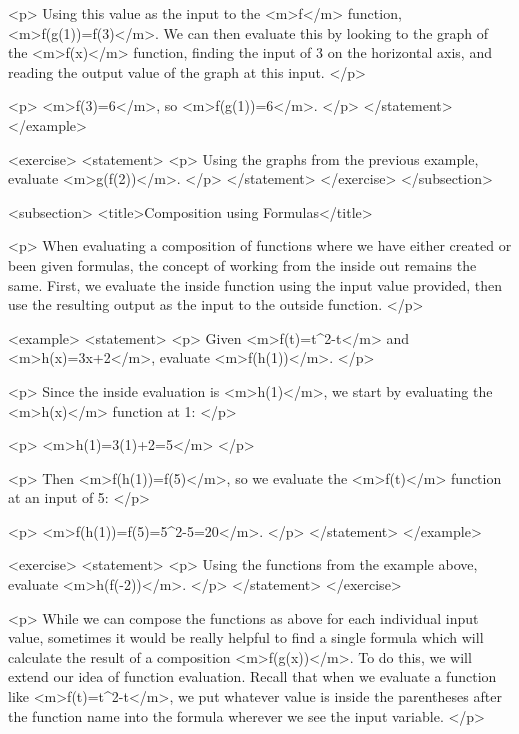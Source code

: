                 <p>
                    Using this value as the input to the <m>f</m> function, <m>f(g(1))=f(3)</m>.
                    We can then evaluate this by looking to the graph of the <m>f(x)</m> function, finding the input of 3 on the horizontal axis, and reading the output value of the graph at this input.
                </p>

                <p>
                    <m>f(3)=6</m>, so <m>f(g(1))=6</m>.
                </p>
            </statement>
        </example>

        <exercise>
            <statement>
                <p>
                    Using the graphs from the previous example, evaluate <m>g(f(2))</m>.
                </p>
            </statement>
        </exercise>
    </subsection>


    <subsection>
        <title>Composition using Formulas</title>

        <p>
            When evaluating a composition of functions where we have either created or been given formulas, the concept of working from the inside out remains the same.
            First, we evaluate the inside function using the input value provided, then use the resulting output as the input to the outside function.
        </p>

        <example>
            <statement>
                <p>
                    Given <m>f(t)=t^{2}-t</m> and <m>h(x)=3x+2</m>, evaluate <m>f(h(1))</m>.
                </p>

                <p>
                    Since the inside evaluation is <m>h(1)</m>, we start by evaluating the <m>h(x)</m> function at 1:
                </p>

                <p>
                    <m>h(1)=3(1)+2=5</m>
                </p>

                <p>
                    Then <m>f(h(1))=f(5)</m>, so we evaluate the <m>f(t)</m> function at an input of 5:
                </p>

                <p>
                    <m>f(h(1))=f(5)=5^{2}-5=20</m>.
                </p>
            </statement>
        </example>

        <exercise>
            <statement>
                <p>
                    Using the functions from the example above, evaluate <m>h(f(-2))</m>.
                </p>
            </statement>
        </exercise>

        <p>
            While we can compose the functions as above for each individual input value, sometimes it would be really helpful to find a single formula which will calculate the result of a composition <m>f(g(x))</m>.
            To do this, we will extend our idea of function evaluation.
            Recall that when we evaluate a function like <m>f(t)=t^{2}-t</m>, we put whatever value is inside the parentheses after the function name into the formula wherever we see the input variable.
        </p>

